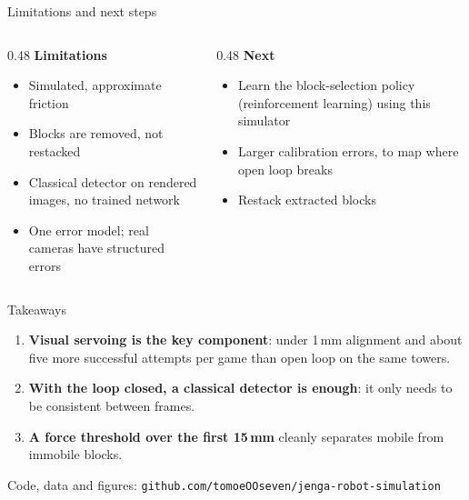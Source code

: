 \documentclass[aspectratio=169,11pt,t]{beamer}
\newcommand{\muted}[1]{{\color{ink2}#1}}
\begin{document}
\begin{frame}{Limitations and next steps}
\begin{columns}[T]
\begin{column}{0.48\textwidth}
\textbf{Limitations}
\begin{itemize}
\item Simulated, approximate friction
\item Blocks are removed, not restacked
\item Classical detector on rendered images, no trained network
\item One error model; real cameras have structured errors
\end{itemize}
\end{column}
\begin{column}{0.48\textwidth}
\textbf{Next}
\begin{itemize}
\item Learn the block-selection policy (reinforcement learning) using this simulator
\item Larger calibration errors, to map where open loop breaks
\item Restack extracted blocks
\end{itemize}
\end{column}
\end{columns}
\end{frame}

\begin{frame}{Takeaways}
\vspace{0.8em}
\begin{enumerate}
\setlength{\itemsep}{0.8em}
\item \textbf{Visual servoing is the key component}: under 1\,mm alignment and about
five more successful attempts per game than open loop on the same towers.
\item \textbf{With the loop closed, a classical detector is enough}: it only needs to be
consistent between frames.
\item \textbf{A force threshold over the first 15\,mm} cleanly separates mobile from
immobile blocks.
\end{enumerate}
\vspace{1.6em}
\muted{\small Code, data and figures: \texttt{github.com/tomoeOOseven/jenga-robot-simulation}}
\end{frame}
\end{document}
